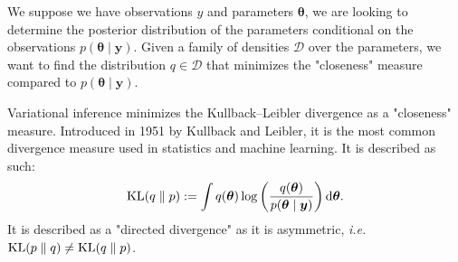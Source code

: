 \documentclass{article}
\numberwithin{equation}{section}
\DeclareMathOperator*{\KL}{{\rm KL}}
\begin{document}
We suppose we have observations $y$ and parameters $\boldsymbol{\theta}$, we are looking to determine the posterior distribution of the parameters conditional on the observations $p(\boldsymbol{\theta} \mid \boldsymbol{y})$. Given a family of densities $\mathcal{D}$ over the parameters, we want to find the distribution $q \in \mathcal{D}$ that minimizes the "closeness" measure compared to $p(\boldsymbol{\theta} \mid \boldsymbol{y})$.

Variational inference minimizes the Kullback--Leibler divergence as a "closeness" measure. Introduced in 1951 by Kullback and Leibler\cite{kl51}, it is the most common divergence measure used in statistics and machine learning. It is described as such:
\begin{equation*}
\KL(q\parallel p) := \int q(\boldsymbol{\theta})\log \left(\frac{q(\boldsymbol{\theta})}{p(\boldsymbol{\theta} \mid \boldsymbol{y})}\right) \mathrm{d}\boldsymbol{\theta}.
\end{equation*} 
It is described as a "directed divergence" as it is asymmetric, \textit{i.e.} $\KL(p\parallel q) \neq \KL(q \parallel p)$.
\end{document}
